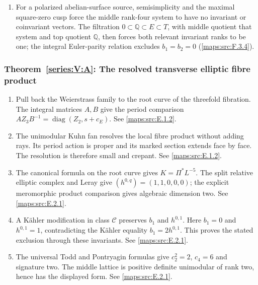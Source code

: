 \documentclass[11pt,a4paper]{article}
\numberwithin{equation}{section}
\theoremstyle{definition}
\begin{document}
\begin{enumerate}[label=\arabic*.,leftmargin=*]
\item\hypertarget{step-V-F-6}{} For a polarized abelian-surface source, semisimplicity and the
  maximal square-zero cusp force the middle rank-four system to have
  no invariant or coinvariant vectors.  The filtration
  $0\subset\mathbb Q\subset E\subset T$, with middle quotient that
  system and top quotient $\mathbb Q$, then forces both relevant
  invariant ranks to be one; the integral Euler-parity relation
  excludes $b_1=b_2=0$ (\cref{maps:src:F.3.4}).

\end{enumerate}

\hypertarget{outline-V-A}{}
\subsubsection*{Theorem~\ref{series:V:A}: The resolved transverse elliptic fibre product}
\begin{enumerate}[label=\arabic*.,leftmargin=*]
\item\hypertarget{step-V-A-1}{} Pull back the Weierstrass family to the root curve of the
threefold fibration.  The integral matrices $A,B$ give the period comparison $AZ_3B^{-1}=\operatorname{diag}(Z_2,s+c_E)$.
See \cref{maps:src:E.1.2}.
\item\hypertarget{step-V-A-2}{} The unimodular Kuhn fan resolves the local fibre product
without adding rays.  Its period action is proper and its marked
section extends face by face.  The resolution is therefore small
and crepant.
See \cref{maps:src:E.1.2}.
\item\hypertarget{step-V-A-3}{} The canonical formula on the root curve gives
$K=\Pi^*L^{-5}$.  The split relative elliptic complex and Leray
give $(h^{0,q})=(1,1,0,0,0)$; the explicit meromorphic product
comparison gives algebraic dimension two.
See \cref{maps:src:E.2.1}.
\item\hypertarget{step-V-A-4}{} A K\"ahler modification in class $\mathcal C$ preserves
$b_1$ and $h^{0,1}$.  Here $b_1=0$ and $h^{0,1}=1$, contradicting
the K\"ahler equality $b_1=2h^{0,1}$.  This proves the stated
exclusion through these invariants.
See \cref{maps:src:E.2.1}.
\item\hypertarget{step-V-A-5}{} The universal Todd and Pontryagin formulas give
$c_2^2=2$, $c_4=6$ and signature two.  The middle lattice is
positive definite unimodular of rank two, hence has the displayed
form.  
See \cref{maps:src:E.2.1}.
\end{enumerate}
\end{document}
